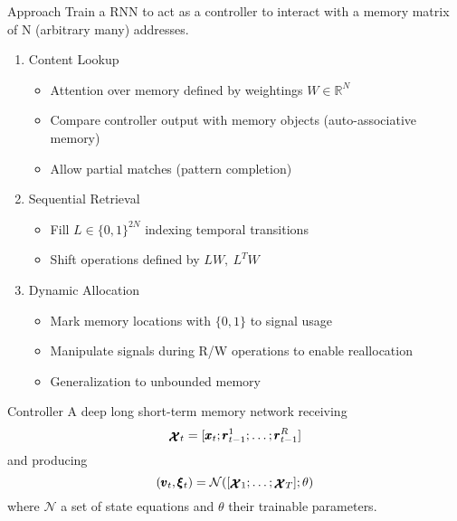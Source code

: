 \documentclass{beamer}
\newcommand{\xx}{\pmb{\raisebox{-1.5pt}{$\mathcal{X}$}}}
\begin{document}
\begin{frame}{Approach}
	Train a RNN to act as a \alert{controller} to interact with a memory matrix of N (arbitrary many) addresses.
	\pause
	\begin{enumerate}
	\item \alert{Content Lookup}\\
		\begin{itemize}
		\item \alert{Attention} over memory defined by weightings $W \in \mathbb{R}^N$
		\item Compare controller output with memory objects (\alert{auto-associative memory})
		\item Allow partial matches  (\alert{pattern completion})
		\end{itemize}
	\pause
	\item \alert{Sequential Retrieval}
		\begin{itemize} 
		\item Fill $L \in \{0,1\}^{2N}$ indexing \alert{temporal transitions}
		\item \alert{Shift} operations defined by $LW,\ L^TW$
		\end{itemize}
	\pause
	\item \alert{Dynamic Allocation}
		\begin{itemize}
		\item Mark memory locations with $\{0,1\}$ to \alert{signal usage}
		\item Manipulate signals during R/W operations to enable \alert{reallocation}
		\item Generalization to \alert{unbounded memory}
		\end{itemize}
	\end{enumerate}
\end{frame}
	
\begin{frame}{Controller}
	A deep \alert{long short-term memory network} receiving 
	\[
	\xx_t=[ \pmb{x}_t; \pmb{r}_{t-1}^1; \dots ;\pmb{r}_{t-1}^R]
	\]
	and producing 
	\[
	(\pmb{v}_t,\pmb{\xi}_t)=\mathcal{N}([\xx_1;\dots;\xx_T];\theta)
	\]
	where $\mathcal{N}$ a set of state equations and $\theta$ their trainable parameters.
\end{frame}
\end{document}
